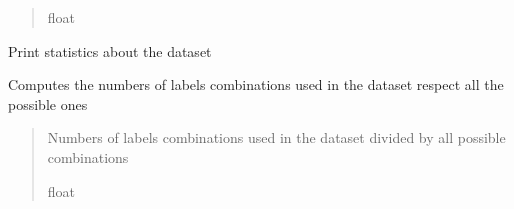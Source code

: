 \documentclass[letterpaper,10pt,english]{sphinxmanual}
\begin{document}
\begin{fulllineitems}
\begin{fulllineitems}
\begin{quote}
\begin{description}
\sphinxAtStartPar
float

\end{description}\end{quote}

\end{fulllineitems}


\begin{fulllineitems}
\label{\detokenize{data/_autosummary/miml.data.miml_dataset.MIMLDataset:miml.data.miml_dataset.MIMLDataset.describe}}
\pysigstartsignatures
\pysiglinewithargsret
{}
{}
{}
\pysigstopsignatures
\sphinxAtStartPar
Print statistics about the dataset

\end{fulllineitems}


\begin{fulllineitems}
\label{\detokenize{data/_autosummary/miml.data.miml_dataset.MIMLDataset:miml.data.miml_dataset.MIMLDataset.distinct}}
\pysigstartsignatures
\pysiglinewithargsret
{}
{}
{}
\pysigstopsignatures
\sphinxAtStartPar
Computes the numbers of labels combinations used in the dataset respect all the possible ones
\begin{quote}\begin{description}
\sphinxAtStartPar
{} \textendash{} Numbers of labels combinations used in the dataset divided by all possible combinations

\sphinxAtStartPar
float

\end{description}\end{quote}

\end{fulllineitems}



\end{fulllineitems}
\end{document}
